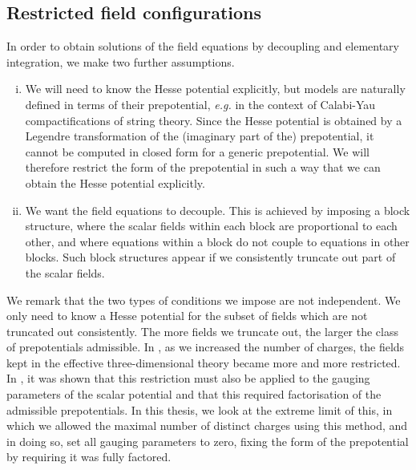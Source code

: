 \subsection{Restricted field configurations}
\label{sec:restricted}
In order to obtain solutions of the field equations by decoupling and elementary integration, we make two further assumptions.

\begin{enumerate}[(i)]
\item We will need to know the Hesse potential explicitly, but models are naturally defined in terms of their prepotential, \textit{e.g.} in the context of Calabi-Yau compactifications of string theory. Since the Hesse potential is obtained by a Legendre transformation of the (imaginary part of the) prepotential, it cannot be computed in closed form for a generic prepotential. We will therefore restrict the form of the prepotential in such a way that we can obtain the Hesse potential explicitly. 
\item We want the field equations to decouple. This is achieved by imposing a block structure, where the scalar fields within each block are proportional to each other, and where equations within a block do not couple to equations in other blocks. Such block structures appear if we consistently truncate out part of the scalar fields.
\end{enumerate}
We remark that the two types of conditions we impose are not independent. We only need to know a Hesse potential for the subset of fields which are not truncated out consistently. The more fields we truncate out, the larger the class of prepotentials admissible. In \cite{Gutowski:2019iyo}, as we increased the number of charges, the fields kept in the effective three-dimensional theory became more and more restricted. In \cite{Dempster:2015}, it was shown that this restriction must also be applied to the gauging parameters of the scalar potential and that this required factorisation of the admissible prepotentials. In this thesis, we look at the extreme limit of this, in which we allowed the maximal number of distinct charges using this method, and in doing so, set all gauging parameters to zero, fixing the form of the prepotential by requiring it was fully factored.

